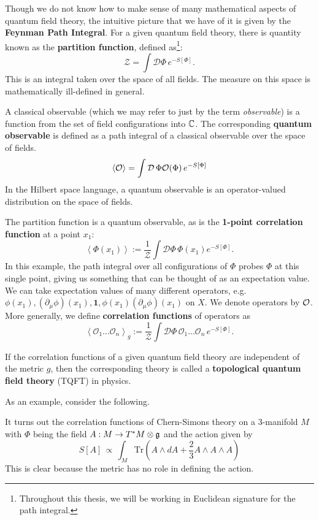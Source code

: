 		Though we do not know how to make sense of many mathematical aspects of quantum field theory, the intuitive picture that we have of it is given by the \textbf{Feynman Path Integral}. For a given quantum field theory, there is quantity known as the \textbf{partition function}, defined as\footnote{Throughout this thesis, we will be working in Euclidean signature for the path integral.}:
		\begin{equation}\label{eq:Z}
			\mathcal Z = \int \mathcal D\Phi\, e^{- S[\Phi]}.
		\end{equation}
		This is an integral taken over the space of all fields. The measure on this space is mathematically ill-defined in general. 
		\begin{phys}
			A classical observable (which we may refer to just by the term \emph{observable}) is a function from the set of field configurations into $\mathbb{C}$. The corresponding \textbf{quantum observable} is defined as a path integral of a classical observable over the space of fields. 
			\[
				\left< \mathcal{O} \right> = \int \mathcal D \, \Phi \mathcal{O}(\Phi) \, e^{-S[\Phi]}
			\]
			In the Hilbert space language, a quantum observable is an operator-valued distribution on the space of fields. 
		\end{phys}
		The partition function is a quantum observable, as is the \textbf{1-point correlation function} at a point $x_1$:
		$$\left< \Phi(x_1) \right> := \frac{1}{\mathcal Z} \int \mathcal D\Phi \, \Phi(x_1) e^{-S[\Phi]}.$$
		In this example, the path integral over all configurations of $\Phi$ probes $\Phi$ at this single point, giving us something that can be thought of as an expectation value. We can take expectation values of many different operators, e.g. $\phi(x_1), (\partial_\mu \phi)(x_1), \mathbf{1}, \phi(x_1) (\partial_\mu \phi)(x_1)$ on $X$. We denote operators by $\mathcal{O}$. More generally, we define \textbf{correlation functions} of operators as 
		$$\left< \mathcal O_1 \dots \mathcal O_n \right>_g := \frac{1}{\mathcal Z} \int \mathcal D\Phi \, \mathcal O_1 \dots \mathcal O_n \, e^{-S[\Phi]}.$$
		\begin{phys}[TQFT]
			If the correlation functions of a given quantum field theory are independent of the metric $g$, then the corresponding theory is called a \textbf{topological quantum field theory} (TQFT) in physics.
		\end{phys}
		As an example, consider the following.
		\begin{eg}
			It turns out the correlation functions of Chern-Simons theory on a 3-manifold $M$ with $\Phi$ being the field $A: M \to T^* M \otimes \frak g$ and the action given by
			$$S[A] \, \propto\,  \int_{M} \mathrm{Tr}\left(A \wedge dA + \frac23 A \wedge A \wedge A \right)$$
			This is clear because the metric has no role in defining the action.
		\end{eg}
		
